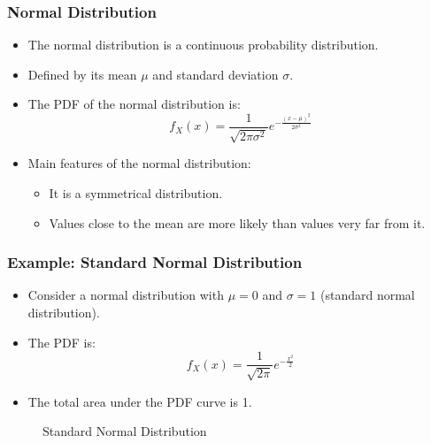 \documentclass[handout]{beamer} %
\begin{document}
\begin{frame}
\frametitle{Normal Distribution}
    \begin{itemize}
        \item The normal distribution is a continuous probability distribution. \pause
        \item Defined by its mean \( \mu \) and standard deviation \( \sigma \). \pause
        \item The PDF of the normal distribution is: \pause
        \[
        f_X(x) = \frac{1}{\sqrt{2\pi\sigma^2}} e^{-\frac{(x-\mu)^2}{2\sigma^2}}
        \]
        \item Main features of the normal distribution: \pause
        \begin{itemize}
            \item It is a symmetrical distribution.
            \item Values close to the mean are more likely than values very far from it.
        \end{itemize}
    \end{itemize}
\end{frame}

\begin{frame}
\frametitle{Example: Standard Normal Distribution}
    \begin{itemize}
        \item Consider a normal distribution with \( \mu = 0 \) and \( \sigma = 1 \) (standard normal distribution). \pause
        \item The PDF is: \pause
        \[
        f_X(x) = \frac{1}{\sqrt{2\pi}} e^{-\frac{x^2}{2}}
        \] \pause
        \item The total area under the PDF curve is 1.
    \end{itemize}
\end{frame}

\begin{frame}
\begin{figure}[ht]
\centering
{}
\caption{Standard Normal Distribution}
\end{figure}
\end{frame}
\end{document}
